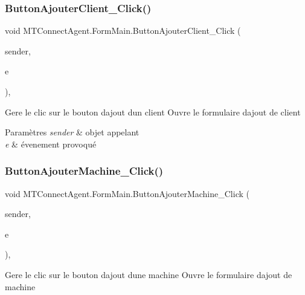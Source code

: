 \subsubsection{\texorpdfstring{Button\+Ajouter\+Client\+\_\+\+Click()}{ButtonAjouterClient\_Click()}}
{\footnotesize\ttfamily void M\+T\+Connect\+Agent.\+Form\+Main.\+Button\+Ajouter\+Client\+\_\+\+Click (\begin{DoxyParamCaption}\item[{object}]{sender,  }\item[{Event\+Args}]{e }\end{DoxyParamCaption})\hspace{0.3cm}{\ttfamily [inline]}, {\ttfamily [private]}}



Gere le clic sur le bouton d\textquotesingle{}ajout d\textquotesingle{}un client Ouvre le formulaire d\textquotesingle{}ajout de client 


\begin{DoxyParams}{Paramètres}
{\em sender} & objet appelant\\
\hline
{\em e} & évenement provoqué\\
\hline
\end{DoxyParams}
\mbox{\label{class_m_t_connect_agent_1_1_form_main_aab7098479c86c56fc6b1bd57cc9fe7fc}} 
\subsubsection{\texorpdfstring{Button\+Ajouter\+Machine\+\_\+\+Click()}{ButtonAjouterMachine\_Click()}}
{\footnotesize\ttfamily void M\+T\+Connect\+Agent.\+Form\+Main.\+Button\+Ajouter\+Machine\+\_\+\+Click (\begin{DoxyParamCaption}\item[{object}]{sender,  }\item[{Event\+Args}]{e }\end{DoxyParamCaption})\hspace{0.3cm}{\ttfamily [inline]}, {\ttfamily [private]}}



Gere le clic sur le bouton d\textquotesingle{}ajout d\textquotesingle{}une machine Ouvre le formulaire d\textquotesingle{}ajout de machine 


